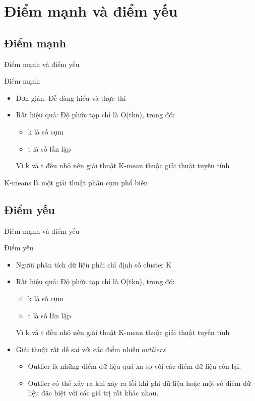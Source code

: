 \documentclass[english,10pt,table]{beamer}
\begin{document}
\section{Điểm mạnh và điểm yếu}
\subsection{Điểm mạnh}
\begin{frame}{Điểm mạnh và điểm yếu}
\begin{block} {Điểm mạnh}
	\begin{itemize}
		\item Đơn giản: Dễ dàng hiểu và thực thi
		\item Rất hiệu quả: Độ phức tạp chỉ là O(tkn), trong đó: 
			\begin{itemize}
				\item k là số cụm
				\item t là số lần lặp
			\end{itemize}
		Vì k và t đều nhỏ nên giải thuật K-mean thuộc giải thuật tuyến tính
	\end{itemize}
	
\end{block}
	K-means là một giải thuật phân cụm phổ biến
\end{frame}

\subsection{Điểm yếu}
\begin{frame}{Điểm mạnh và điểm yếu}
\begin{block} {Điểm yếu}
	\begin{itemize}
		\item Người phân tích dữ liệu phải chỉ định số cluster K
		\item Rất hiệu quả: Độ phức tạp chỉ là O(tkn), trong đó: 
		\begin{itemize}
			\item k là số cụm
			\item t là số lần lặp
		\end{itemize}
		Vì k và t đều nhỏ nên giải thuật K-mean thuộc giải thuật tuyến tính
		\item Giải thuật rất dễ sai với các điểm nhiễu \alert{$outliers$}
			\begin{itemize}
			\item Outlier là những điểm dữ liệu quá xa so với các điểm dữ liệu còn lại.
			\item Outlier có thể xảy ra khi xảy ra lỗi khi ghi dữ liệu hoặc một số điểm dữ liệu đặc biệt với các giá trị rất khác nhau.
			\end{itemize}
	\end{itemize}
\end{block}
\end{frame}
\end{document}
